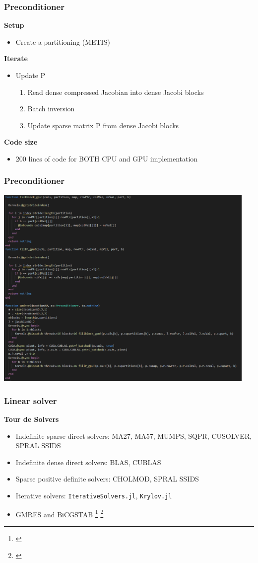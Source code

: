 \begin{frame}
  \frametitle{Preconditioner}
  {\bf Setup}
  \begin{itemize}
    \item Create a partitioning (METIS)
  \end{itemize}
  {\bf Iterate}
  \begin{itemize}
    \item Update P
    \begin{enumerate}
      \item Read dense compressed Jacobian into dense Jacobi blocks
      \item Batch inversion
      \item Update sparse matrix P from dense Jacobi blocks
    \end{enumerate}
  \end{itemize}
  {\bf Code size}
  \begin{itemize}
    \item 200 lines of code for BOTH CPU and GPU implementation
  \end{itemize}
\end{frame}

\begin{frame}
  \frametitle{Preconditioner}
  \includegraphics[width=0.95\textwidth]{figures/preconditioner}
\end{frame}

\begin{frame}
  \frametitle{Linear solver}
  {\bf Tour de Solvers}
  \begin{itemize}
    \item Indefinite sparse direct solvers: MA27, MA57, MUMPS, SQPR, CUSOLVER, SPRAL SSIDS
    \item Indefinite dense direct solvers: BLAS, CUBLAS
    \item Sparse positive definite solvers: CHOLMOD, SPRAL SSIDS
    \item Iterative solvers: \lstinline{IterativeSolvers.jl}, \lstinline{Krylov.jl} 
    \item GMRES and BiCGSTAB \footnote{\cite{bicgstabVorst}} \footnote{\cite{sleijpen1993bicgstab}}
  \end{itemize}
\end{frame}

